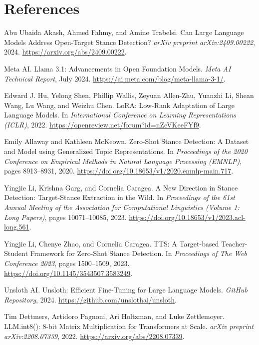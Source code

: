 \documentclass[twocolumn, 11pt,letterpaper]{article}
\begin{document}
\section*{References}
\begin{thebibliography}{99}

Abu Ubaida Akash, Ahmed Fahmy, and Amine Trabelsi.
\newblock Can Large Language Models Address Open-Target Stance Detection?
\newblock \emph{arXiv preprint arXiv:2409.00222}, 2024.
\newblock \url{https://arxiv.org/abs/2409.00222}.

Meta AI.
\newblock Llama 3.1: Advancements in Open Foundation Models.
\newblock \emph{Meta AI Technical Report}, July 2024.
\newblock \url{https://ai.meta.com/blog/meta-llama-3-1/}.

Edward J. Hu, Yelong Shen, Phillip Wallis, Zeyuan Allen-Zhu, Yuanzhi Li, Shean Wang, Lu Wang, and Weizhu Chen.
\newblock LoRA: Low-Rank Adaptation of Large Language Models.
\newblock In \emph{International Conference on Learning Representations (ICLR)}, 2022.
\newblock \url{https://openreview.net/forum?id=nZeVKeeFYf9}.

Emily Allaway and Kathleen McKeown.
\newblock Zero-Shot Stance Detection: A Dataset and Model using Generalized Topic Representations.
\newblock In \emph{Proceedings of the 2020 Conference on Empirical Methods in Natural Language Processing (EMNLP)}, pages 8913--8931, 2020.
\newblock \url{https://doi.org/10.18653/v1/2020.emnlp-main.717}.

Yingjie Li, Krishna Garg, and Cornelia Caragea.
\newblock A New Direction in Stance Detection: Target-Stance Extraction in the Wild.
\newblock In \emph{Proceedings of the 61st Annual Meeting of the Association for Computational Linguistics (Volume 1: Long Papers)}, pages 10071--10085, 2023.
\newblock \url{https://doi.org/10.18653/v1/2023.acl-long.561}.

Yingjie Li, Chenye Zhao, and Cornelia Caragea.
\newblock TTS: A Target-based Teacher-Student Framework for Zero-Shot Stance Detection.
\newblock In \emph{Proceedings of The Web Conference 2023}, pages 1500--1509, 2023.
\newblock \url{https://doi.org/10.1145/3543507.3583249}.

Unsloth AI.
\newblock Unsloth: Efficient Fine-Tuning for Large Language Models.
\newblock \emph{GitHub Repository}, 2024.
\newblock \url{https://github.com/unslothai/unsloth}.

Tim Dettmers, Artidoro Pagnoni, Ari Holtzman, and Luke Zettlemoyer.
\newblock LLM.int8(): 8-bit Matrix Multiplication for Transformers at Scale.
\newblock \emph{arXiv preprint arXiv:2208.07339}, 2022.
\newblock \url{https://arxiv.org/abs/2208.07339}.


\end{thebibliography}
\end{document}
